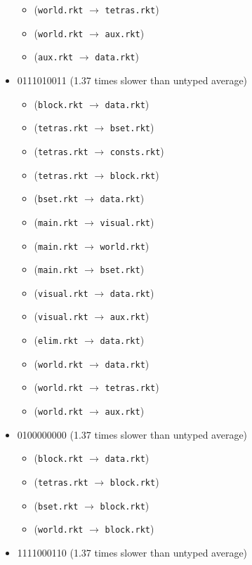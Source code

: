 \documentclass{article}
\newcommand{\mono}[1]{\texttt{#1}}
\begin{document}
\begin{itemize}
\begin{itemize}
  \item (\mono{world.rkt} $\rightarrow$ \mono{tetras.rkt})
  \item (\mono{world.rkt} $\rightarrow$ \mono{aux.rkt})
  \item (\mono{aux.rkt} $\rightarrow$ \mono{data.rkt})
  \end{itemize}
\item 0111010011 (1.37 times slower than untyped average)
  \begin{itemize}
  \item (\mono{block.rkt} $\rightarrow$ \mono{data.rkt})
  \item (\mono{tetras.rkt} $\rightarrow$ \mono{bset.rkt})
  \item (\mono{tetras.rkt} $\rightarrow$ \mono{consts.rkt})
  \item (\mono{tetras.rkt} $\rightarrow$ \mono{block.rkt})
  \item (\mono{bset.rkt} $\rightarrow$ \mono{data.rkt})
  \item (\mono{main.rkt} $\rightarrow$ \mono{visual.rkt})
  \item (\mono{main.rkt} $\rightarrow$ \mono{world.rkt})
  \item (\mono{main.rkt} $\rightarrow$ \mono{bset.rkt})
  \item (\mono{visual.rkt} $\rightarrow$ \mono{data.rkt})
  \item (\mono{visual.rkt} $\rightarrow$ \mono{aux.rkt})
  \item (\mono{elim.rkt} $\rightarrow$ \mono{data.rkt})
  \item (\mono{world.rkt} $\rightarrow$ \mono{data.rkt})
  \item (\mono{world.rkt} $\rightarrow$ \mono{tetras.rkt})
  \item (\mono{world.rkt} $\rightarrow$ \mono{aux.rkt})
  \end{itemize}
\item 0100000000 (1.37 times slower than untyped average)
  \begin{itemize}
  \item (\mono{block.rkt} $\rightarrow$ \mono{data.rkt})
  \item (\mono{tetras.rkt} $\rightarrow$ \mono{block.rkt})
  \item (\mono{bset.rkt} $\rightarrow$ \mono{block.rkt})
  \item (\mono{world.rkt} $\rightarrow$ \mono{block.rkt})
  \end{itemize}
\item 1111000110 (1.37 times slower than untyped average)

\end{itemize}
\end{document}

